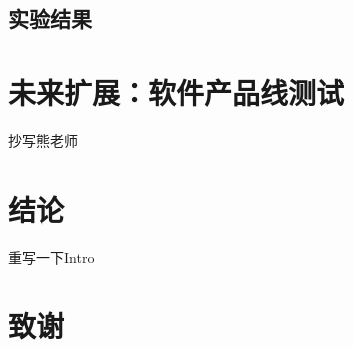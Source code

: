 \documentclass[nofonts]{ctexrep}
\begin{document}
\section{实验结果}

\chapter{未来扩展：软件产品线测试}
抄写熊老师

\chapter{结论}
重写一下Intro




\chapter*{致谢}
\end{document}
